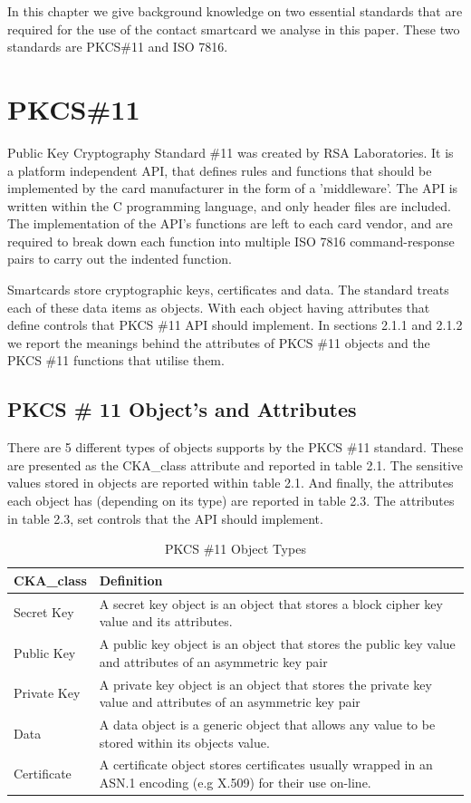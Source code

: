 \documentclass[bsc,frontabs,twoside,singlespacing,parskip,deptreport]{infthesis}     %
\begin{document}
In this chapter we give background knowledge on two essential standards that are required for the use of the contact smartcard we analyse in this paper. These two standards are PKCS\#11 and ISO 7816.

\section{PKCS\#11}
Public Key Cryptography Standard \#11 was created by RSA Laboratories. It is a platform independent API, that defines rules and functions that should be implemented by the card manufacturer in the form of a 'middleware'. The API is written within the C programming language, and only header files are included. The implementation of the API's functions are left to each card vendor, and are required to break down each function into multiple ISO 7816 command-response pairs to carry out the indented function.

Smartcards store cryptographic keys, certificates and data. The standard treats each of these data items as objects. With each object having attributes that define controls that PKCS \#11 API should implement. In sections 2.1.1 and 2.1.2 we report the meanings behind the attributes of PKCS \#11 objects and the PKCS \#11 functions that utilise them.

\pagebreak
\subsection{PKCS \# 11 Object's and Attributes}

There are 5 different types of objects supports by the PKCS \#11 standard. These are presented as the CKA\_class attribute and reported in table 2.1. The sensitive values stored in objects are reported within table 2.1. And finally, the attributes each object has (depending on its type) are reported in table 2.3. The attributes in table 2.3, set controls that the API should implement.

\begin{table}[H]
\begin{tabular}{|l|p{10cm}|}
\hline 
CKA\_class & Definition\\
\hline
Secret Key & A secret key object is an object that stores a block cipher key value and its attributes.\\
\hline
Public Key & A public key object is an object that stores the public key value and attributes of an asymmetric key pair\\
\hline
Private Key & A private key object is an object that stores the private key value and attributes of an asymmetric key pair\\
\hline
Data & A data object is a generic object that allows any value to be stored within its objects value.\\
\hline
Certificate & A certificate object stores certificates usually wrapped in an ASN.1 encoding (e.g X.509) for their use on-line.\\
\hline
\end{tabular}
\caption{PKCS \#11 Object Types}
\end{table}
\end{document}
